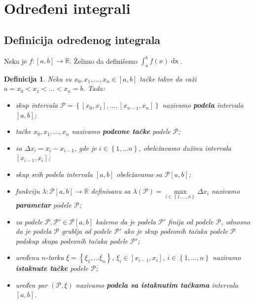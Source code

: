 \documentclass{article}
\newtheorem{definicija}{Definicija}[section]
\DeclareMathOperator{\dx}{dx}
\begin{document}
\section{Određeni integrali}

\subsection{Definicija određenog integrala}

Neka je $f:\left[a,b\right]\longrightarrow\mathbb{R}$. Želimo da definišemo $\displaystyle\int_{a}^{b}f\left(x\right)\dx$.\par

\begin{defbox}
    \label{definicija_2.1}
    \begin{definicija}
        Neka su $x_0,x_1,\dotsc,x_n\in\left[a,b\right]$ tačke takve da važi $a=x_0<x_1<\dotsc<x_n=b$. Tada:
        \begin{itemize}
            \item skup intervala $\mathcal{P}=\left\{\left[x_0,x_1\right],\dotsc,\left[x_{n-1},x_n\right]\right\}$ nazivamo \textbf{podela} intervala $\left[a,b\right]$;
            \item tačke $x_0,x_1,\dotsc,x_n$ nazivamo \textbf{podeone tačke} podele $\mathcal{P}$;
            \item sa $\varDelta x_i=x_i-x_{i-1}$, gde je $i\in\left\{1,\dotsc n\right\}$, obeležavamo dužinu intervala $\left[x_{i-1},x_i\right]$;
            \item skup svih podela intervala $\left[a,b\right]$ obeležavamo sa $\mathcal{P}\left[a,b\right]$;
            \item funkciju $\lambda: \mathcal{P}\left[a,b\right]\longrightarrow \mathbb{R}$ definisanu sa $\lambda\left(\mathcal{P}\right)=\underset{i \in \left\{1, \dots, n\right\}}{\max}\varDelta x_i$ nazivamo \textbf{parametar} podele $\mathcal{P}$;
            \item za podele $\mathcal{P},\mathcal{P}'\in\mathcal{P}\left[a,b\right]$ kažemo da je podela $\mathcal{P}'$ finija od podele $\mathcal{P}$, odnosno da
                  je podela $\mathcal{P}$ grublja od podele $\mathcal{P}'$ ako je skup podeonih tačaka podele $\mathcal{P}$ podskup skupa
                  podeonih tačaka podele $\mathcal{P}'$;
            \item uređenu $n$-torku $\xi=\left\{\xi_1,\dotsc\xi_n\right\}$, $\xi_i\in\left[x_{i-1},x_i\right]$, $i\in\left\{1,\dotsc,n\right\}$ nazivamo \textbf{istaknute tačke} podele $\mathcal{P}$;
            \item uređen par $\left(\mathcal{P},\xi\right)$ nazivamo \textbf{podela sa istaknutim tačkama} intervala $\left[a,b\right]$.
        \end{itemize}
    \end{definicija}
\end{defbox}
\end{document}
